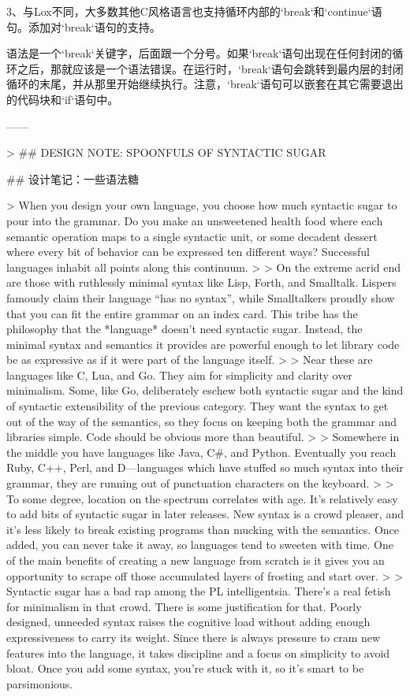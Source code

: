 \documentclass[cn,11pt,chinese]{elegantbook}
\begin{document}
{3、与Lox不同，大多数其他C风格语言也支持循环内部的`break`和`continue`语句。添加对`break`语句的支持。

语法是一个`break`关键字，后面跟一个分号。如果`break`语句出现在任何封闭的循环之后，那就应该是一个语法错误。在运行时，`break`语句会跳转到最内层的封闭循环的末尾，并从那里开始继续执行。注意，`break`语句可以嵌套在其它需要退出的代码块和`if`语句中。

------

> ## DESIGN NOTE: SPOONFULS OF SYNTACTIC SUGAR

## 设计笔记：一些语法糖

> When you design your own language, you choose how much syntactic sugar to pour into the grammar. Do you make an unsweetened health food where each semantic operation maps to a single syntactic unit, or some decadent dessert where every bit of behavior can be expressed ten different ways? Successful languages inhabit all points along this continuum.
>
> On the extreme acrid end are those with ruthlessly minimal syntax like Lisp, Forth, and Smalltalk. Lispers famously claim their language “has no syntax”, while Smalltalkers proudly show that you can fit the entire grammar on an index card. This tribe has the philosophy that the *language* doesn’t need syntactic sugar. Instead, the minimal syntax and semantics it provides are powerful enough to let library code be as expressive as if it were part of the language itself.
>
> Near these are languages like C, Lua, and Go. They aim for simplicity and clarity over minimalism. Some, like Go, deliberately eschew both syntactic sugar and the kind of syntactic extensibility of the previous category. They want the syntax to get out of the way of the semantics, so they focus on keeping both the grammar and libraries simple. Code should be obvious more than beautiful.
>
> Somewhere in the middle you have languages like Java, C#, and Python. Eventually you reach Ruby, C++, Perl, and D—languages which have stuffed so much syntax into their grammar, they are running out of punctuation characters on the keyboard.
>
> To some degree, location on the spectrum correlates with age. It’s relatively easy to add bits of syntactic sugar in later releases. New syntax is a crowd pleaser, and it’s less likely to break existing programs than mucking with the semantics. Once added, you can never take it away, so languages tend to sweeten with time. One of the main benefits of creating a new language from scratch is it gives you an opportunity to scrape off those accumulated layers of frosting and start over.
>
> Syntactic sugar has a bad rap among the PL intelligentsia. There’s a real fetish for minimalism in that crowd. There is some justification for that. Poorly designed, unneeded syntax raises the cognitive load without adding enough expressiveness to carry its weight. Since there is always pressure to cram new features into the language, it takes discipline and a focus on simplicity to avoid bloat. Once you add some syntax, you’re stuck with it, so it’s smart to be parsimonious.
}
\end{document}
